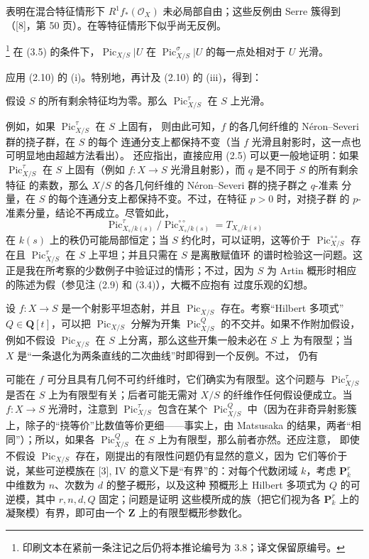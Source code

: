 表明在混合特征情形下 $R^1f_*(\mathcal O_X)$ 未必局部自由；这些反例由 Serre
簇得到（[8]，第 50 页）。在等特征情形下似乎尚无反例。

\footnote{印刷文本在紧前一条注记之后仍将本推论编号为
3.8；译文保留原编号。} 在 (3.5) 的条件下，$\operatorname{Pic}_{X/S}|U$ 在
$\operatorname{Pic}_{X/S}^\sigma|U$ 的每一点处相对于 $U$ 光滑。

应用 (2.10) 的 (i)。特别地，再计及 (2.10) 的 (iii)，得到：

 假设 $S$ 的所有剩余特征均为零。那么
$\operatorname{Pic}_{X/S}^\tau$ 在 $S$ 上光滑。

 例如，如果 $\operatorname{Pic}_{X/S}^\tau$ 在 $S$ 上固有，
则由此可知，$f$ 的各几何纤维的 Néron--Severi 群的挠子群，在 $S$ 的每个
连通分支上都保持不变（当 $f$ 光滑且射影时，这一点也可明显地由超越方法看出）。
还应指出，直接应用 (2.5) 可以更一般地证明：如果
$\operatorname{Pic}_{X/S}^\tau$ 在 $S$ 上固有（例如
$f:X\longrightarrow S$ 光滑且射影），而 $q$ 是不同于 $S$ 的所有剩余特征
的素数，那么 $X/S$ 的各几何纤维的 Néron--Severi 群的挠子群之 $q$-准素
分量，在 $S$ 的每个连通分支上都保持不变。不过，在特征 $p>0$ 时，对挠子群
的 $p$-准素分量，结论不再成立。尽管如此，
\[
\operatorname{Pic}_{X_s/k(s)}^\tau/
\operatorname{Pic}_{X_s/k(s)}^{\circ\circ}=T_{X_s/k(s)}
\]
在 $k(s)$ 上的秩仍可能局部恒定；当 $S$ 约化时，可以证明，这等价于
$\operatorname{Pic}_{X/S}^{\circ\circ}$ 存在且
$\operatorname{Pic}_{X/S}^\tau$ 在 $S$ 上平坦；并且只需在 $S$ 是离散赋值环
的谱时检验这一问题。这正是我在所考察的少数例子中验证过的情形；不过，因为
$S$ 为 Artin 概形时相应的陈述为假（参见注 (2.9) 和 (3.4)），大概不应抱有
过度乐观的幻想。


设 $f:X\longrightarrow S$ 是一个射影平坦态射，并且
$\operatorname{Pic}_{X/S}$ 存在。考察“Hilbert 多项式”
$Q\in\mathbf Q[t]$，可以把 $\operatorname{Pic}_{X/S}$ 分解为开集
$\operatorname{Pic}_{X/S}^Q$ 的不交并。如果不作附加假设，例如不假设
$\operatorname{Pic}_{X/S}$ 在 $S$ 上分离，那么这些开集一般未必在 $S$ 上
为有限型；当 $X$ 是“一条退化为两条直线的二次曲线”时即得到一个反例。不过，
仍有

可能在 $f$ 可分且具有几何不可约纤维时，它们确实为有限型。这个问题与
$\operatorname{Pic}_{X/S}^\tau$ 是否在 $S$ 上为有限型有关；后者可能无需对
$X/S$ 的纤维作任何假设便成立。当 $f:X\longrightarrow S$ 光滑时，注意到
$\operatorname{Pic}_{X/S}^\tau$ 包含在某个 $\operatorname{Pic}_{X/S}^Q$
中（因为在非奇异射影簇上，除子的“挠等价”比数值等价更细——事实上，由
Matsusaka 的结果，两者“相同”）；所以，如果各
$\operatorname{Pic}_{X/S}^Q$ 在 $S$ 上为有限型，那么前者亦然。还应注意，
即使不假设
$\operatorname{Pic}_{X/S}$ 存在，刚提出的有限性问题仍有显然的意义，因为
它们等价于说，某些可逆模族在 [3], IV 的意义下是“有界”的：对每个代数闭域
$k$，考虑 $\mathbf P_k^r$ 中维数为 $n$、次数为 $d$ 的整子概形，以及这种
预概形上 Hilbert 多项式为 $Q$ 的可逆模，其中 $r,n,d,Q$ 固定；问题是证明
这些模所成的族（把它们视为各 $\mathbf P_k^r$ 上的凝聚模）有界，即可由一个
$\mathbf Z$ 上的有限型概形参数化。

